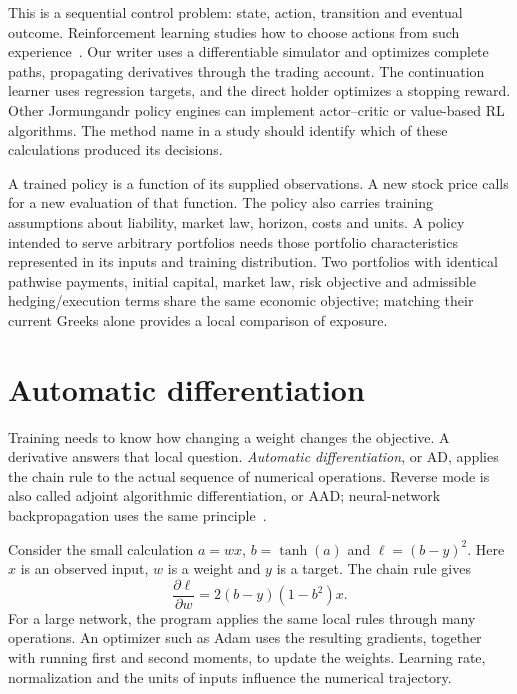 \documentclass[8pt]{strategynet-journal}
\begin{document}
\begin{SNcolumns}
This is a sequential control problem: state, action, transition and eventual
outcome. Reinforcement learning studies how to choose actions from such
experience~\cite{sutton}. Our writer uses a differentiable simulator and
optimizes complete paths, propagating derivatives through the trading account.
The continuation learner uses regression targets, and the direct holder
optimizes a stopping reward. Other Jormungandr policy engines can implement
actor--critic or value-based RL algorithms. The method name in a study should
identify which of these calculations produced its decisions.

A trained policy is a function of its supplied observations. A new stock
price calls for a new evaluation of that function. The policy also carries
training assumptions about liability, market law, horizon, costs and units.
A policy intended to serve arbitrary portfolios needs those portfolio
characteristics represented in its inputs and training distribution. Two
portfolios with identical pathwise payments, initial capital, market law, risk
objective and admissible hedging/execution terms share the same economic objective; matching their current Greeks alone
provides a local comparison of exposure.

\section{Automatic differentiation}
Training needs to know how changing a weight changes the objective. A derivative
answers that local question. \emph{Automatic differentiation}, or AD, applies
the chain rule to the actual sequence of numerical operations. Reverse mode
is also called adjoint algorithmic differentiation, or AAD; neural-network
backpropagation uses the same principle~\cite{ad}.

Consider the small calculation $a=wx$, $b=\tanh(a)$ and
$\ell=(b-y)^2$. Here $x$ is an observed input, $w$ is a weight and $y$ is a
target. The chain rule gives
\[
 \frac{\partial\ell}{\partial w}
 =2(b-y)(1-b^2)x.
\]
For a large network, the program applies the same local rules through many
operations. An optimizer such as Adam uses the resulting gradients, together
with running first and second moments, to update the weights. Learning rate,
normalization and the units of inputs influence the numerical trajectory.

\begin{center}\begin{minipage}{\linewidth}\centering
{}
\end{minipage}\end{center}


\end{SNcolumns}
\end{document}
